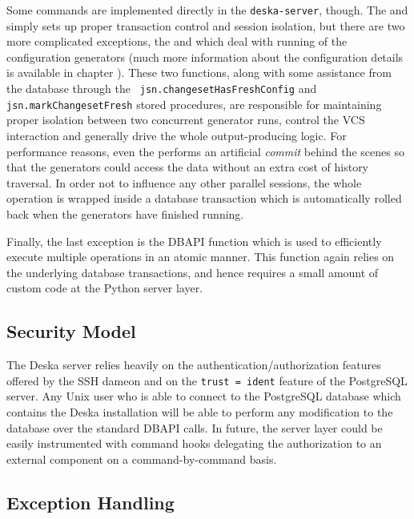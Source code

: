 \documentclass[deska]{subfiles}
\begin{document}
Some commands are implemented directly in the {\tt deska-server}, though.  The  and
 simply sets up proper transaction control and session isolation, but there are two more
complicated exceptions, the  and  which deal with running of
the configuration generators (much more information about the configuration details is available in chapter
).  These two functions, along with some assistance from the database through the {\tt
jsn.changesetHasFreshConfig} and {\tt jsn.markChangesetFresh} stored procedures, are responsible for maintaining proper
isolation between two concurrent generator runs, control the VCS interaction and generally drive the whole
output-producing logic.  For performance reasons, even the  performs an artificial {\em
commit} behind the scenes so that the generators could access the data without an extra cost of history traversal.  In
order not to influence any other parallel sessions, the whole operation is wrapped inside a database transaction which
is automatically rolled back when the generators have finished running.

Finally, the last exception is the  DBAPI function which is used to efficiently
execute multiple operations in an atomic manner.  This function again relies on the underlying database transactions,
and hence requires a small amount of custom code at the Python server layer.

\subsection{Security Model}
\label{sec:server-security-model}

The Deska server relies heavily on the authentication/authorization features offered by the SSH dameon and on the
{\tt trust = ident} feature of the PostgreSQL server.  Any Unix user who is able to connect to the PostgreSQL database
which contains the Deska installation will be able to perform any modification to the database over the standard DBAPI
calls.  In future, the server layer could be easily instrumented with command hooks delegating the authorization to an
external component on a command-by-command basis.

\subsection{Exception Handling}
\end{document}
